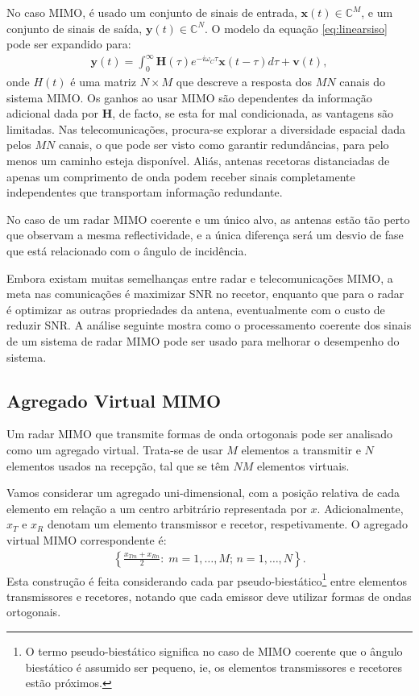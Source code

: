 \documentclass[purist,portuguese]{ist-report}
\begin{document}
No caso MIMO, é usado um conjunto de sinais de entrada, $\mathbf{x}(t)\in\mathbb{C}^M$, e um conjunto de sinais de saída, $\mathbf{y}(t)\in\mathbb{C}^N$.
O modelo da equação \ref{eq:linearsiso} pode ser expandido para:
\begin{align}
  \mathbf{y}(t) = \int_0^\infty \mathbf{H}(\tau)e^{-i\omega_C \tau}\mathbf{x}(t-\tau)d\tau + \mathbf{v}(t),
  \label{eq:linearmimo}
\end{align}
onde $H(t)$ é uma matriz $N\times M$ que descreve a resposta dos $MN$ canais do sistema MIMO.
Os ganhos ao usar MIMO são dependentes da informação adicional dada por $\mathbf{H}$, de facto, se esta for mal condicionada, as vantagens são limitadas. 
Nas telecomunicações, procura-se explorar a diversidade espacial dada pelos $MN$ canais, o que pode ser visto como garantir redundâncias, para pelo menos um caminho esteja disponível.
Aliás, antenas recetoras distanciadas de apenas um comprimento de onda podem receber sinais completamente independentes que transportam informação redundante.

No caso de um radar MIMO coerente e um único alvo, as antenas estão tão perto que observam a mesma reflectividade, e a única diferença será um desvio de fase que está relacionado com o ângulo de incidência.

Embora existam muitas semelhanças entre radar e telecomunicações MIMO, a meta nas comunicações é maximizar SNR no recetor, enquanto que para o radar é optimizar as outras propriedades da antena, eventualmente com o custo de reduzir SNR.
A análise seguinte mostra como o processamento coerente dos sinais de um sistema de radar MIMO pode ser usado para melhorar o desempenho do sistema.

\subsection{Agregado Virtual MIMO}

Um radar MIMO que transmite formas de onda ortogonais pode ser analisado como um agregado virtual.
Trata-se de usar $M$ elementos a transmitir e $N$ elementos usados na recepção, tal que se têm $NM$ elementos virtuais.

Vamos considerar um agregado uni-dimensional, com a posição relativa de cada elemento em relação a um centro arbitrário representada por $x$. 
Adicionalmente, $x_T$ e $x_R$ denotam um elemento transmissor e recetor, respetivamente.
O agregado virtual MIMO correspondente é:
\begin{align}
  \left\{ \frac{x_{Tm}+x_{Rn}}{2}:\; m=1,\ldots,M;\,n=1,\ldots,N \right\}.
  \label{eq:virtualmimo}
\end{align}
Esta construção é feita considerando cada par pseudo-biestático\footnote{O termo pseudo-biestático significa no caso de MIMO coerente que o ângulo biestático é assumido ser pequeno, ie, os elementos transmissores e recetores estão próximos.} entre elementos transmissores e recetores, notando que cada emissor deve utilizar formas de ondas ortogonais.
\end{document}
